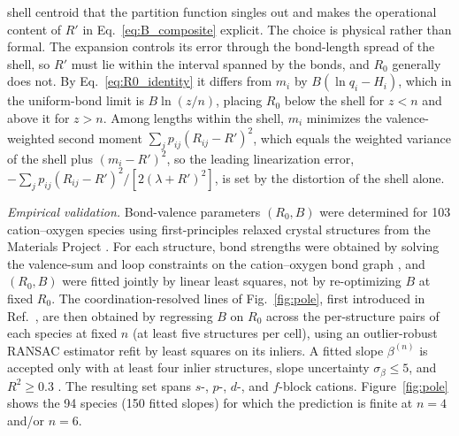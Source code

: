 \documentclass[aps,prmaterials,twocolumn,10pt,superscriptaddress,floatfix]{revtex4-2}
\newcommand{\runinsec}[1]{\medskip\emph{#1}}
\begin{document}
shell centroid that the partition function singles out and makes the
operational content of $R'$ in Eq.~\eqref{eq:B_composite} explicit.
The choice is physical rather than formal.  The expansion controls
its error through the bond-length spread of the shell, so $R'$ must
lie within the interval spanned by the bonds, and $R_0$ generally
does not.  By Eq.~\eqref{eq:R0_identity} it differs from $m_i$ by
$B(\ln q_i-H_i)$, which in the uniform-bond limit is $B\ln(z/n)$,
placing $R_0$ below the shell for $z<n$ and above it for $z>n$.
Among lengths within the shell, $m_i$ minimizes the valence-weighted
second moment $\sum_j p_{ij}(R_{ij}-R')^2$, which equals the weighted
variance of the shell plus $(m_i-R')^2$, so the leading linearization
error, $-\sum_j p_{ij}(R_{ij}-R')^2/[2(\lambda+R')^2]$, is set by the
distortion of the shell alone.

\runinsec{Empirical validation.} Bond-valence parameters $(R_0,B)$ were
determined for 103 cation--oxygen species using first-principles
relaxed crystal
structures from the Materials Project \cite{MaterialsProject,Horton2025}.
For each structure, bond strengths were obtained by solving the
valence-sum and loop constraints on the cation--oxygen bond graph
\cite{Li2025}, and $(R_0,B)$ were fitted jointly by linear least
squares, not by re-optimizing $B$ at fixed $R_0$.
The coordination-resolved
lines of Fig.~\ref{fig:pole}, first introduced in
Ref.~\cite{Li2025}, are then obtained by regressing $B$ on
$R_0$ across the per-structure pairs of each species at fixed $n$ (at
least five structures per cell), using an outlier-robust RANSAC
estimator refit by least squares on its inliers.  A fitted slope
$\beta^{(n)}$ is accepted only with at least four inlier structures,
slope uncertainty $\sigma_\beta\le 5$, and $R^2\ge 0.3$
\cite{suppmat,YukawaScreeningRepo}.  The resulting set spans $s$-,
$p$-, $d$-, and $f$-block cations.  Figure~\ref{fig:pole} shows the 94
species (150 fitted slopes) for which the prediction is finite at
$n=4$ and/or $n=6$.
\end{document}
